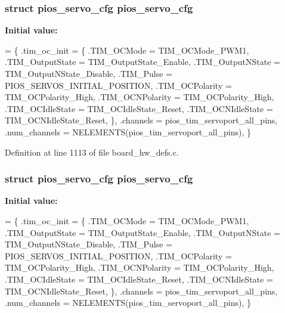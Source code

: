 \hypertarget{group___tau_labs_core_ga57a87ef16d7949a9cc3589efc8d88a28}{
\subsubsection[{pios\-\_\-servo\-\_\-cfg}]{\setlength{\rightskip}{0pt plus 5cm}struct {\bf pios\-\_\-servo\-\_\-cfg} {\bf pios\-\_\-servo\-\_\-cfg}}}\label{group___tau_labs_core_ga57a87ef16d7949a9cc3589efc8d88a28}
{\bfseries Initial value\-:}
\begin{DoxyCode}
= \{
        .tim\_oc\_init = \{
                .TIM\_OCMode = TIM\_OCMode\_PWM1,
                .TIM\_OutputState = TIM\_OutputState\_Enable,
                .TIM\_OutputNState = TIM\_OutputNState\_Disable,
                .TIM\_Pulse = PIOS\_SERVOS\_INITIAL\_POSITION,
                .TIM\_OCPolarity = TIM\_OCPolarity\_High,
                .TIM\_OCNPolarity = TIM\_OCPolarity\_High,
                .TIM\_OCIdleState = TIM\_OCIdleState\_Reset,
                .TIM\_OCNIdleState = TIM\_OCNIdleState\_Reset,
        \},
        .channels = pios\_tim\_servoport\_all\_pins,
        .num\_channels = NELEMENTS(pios\_tim\_servoport\_all\_pins),
\}
\end{DoxyCode}


Definition at line 1113 of file board\-\_\-hw\-\_\-defs.\-c.

\hypertarget{group___tau_labs_core_ga57a87ef16d7949a9cc3589efc8d88a28}{
\subsubsection[{pios\-\_\-servo\-\_\-cfg}]{\setlength{\rightskip}{0pt plus 5cm}struct {\bf pios\-\_\-servo\-\_\-cfg} {\bf pios\-\_\-servo\-\_\-cfg}}}\label{group___tau_labs_core_ga57a87ef16d7949a9cc3589efc8d88a28}
{\bfseries Initial value\-:}
\begin{DoxyCode}
= \{
        .tim\_oc\_init = \{
                .TIM\_OCMode = TIM\_OCMode\_PWM1,
                .TIM\_OutputState = TIM\_OutputState\_Enable,
                .TIM\_OutputNState = TIM\_OutputNState\_Disable,
                .TIM\_Pulse = PIOS\_SERVOS\_INITIAL\_POSITION,
                .TIM\_OCPolarity = TIM\_OCPolarity\_High,
                .TIM\_OCNPolarity = TIM\_OCPolarity\_High,
                .TIM\_OCIdleState = TIM\_OCIdleState\_Reset,
                .TIM\_OCNIdleState = TIM\_OCNIdleState\_Reset,
        \},
        .channels = pios\_tim\_servoport\_all\_pins,
        .num\_channels = NELEMENTS(pios\_tim\_servoport\_all\_pins),
\}
\end{DoxyCode}


